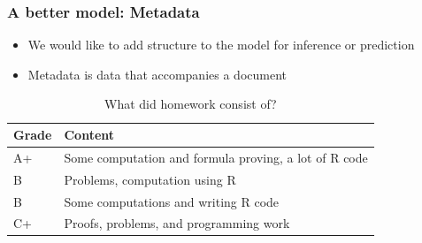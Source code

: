 \documentclass[presentation]{beamer}
\begin{document}
\begin{frame}
\frametitle{A better model: Metadata}
\begin{itemize}
\item We would like to add structure to the model for inference or prediction
\pause
\item Metadata is data that accompanies a document
\pause
\end{itemize}
\begin{table}[!hbpt]
\caption{What did homework consist of?} \label{tab:title}
\pause
\begin{center}
\begin{tabular} {l l}
\textbf{Grade} & \textbf{Content} \\
\hline
A+ & Some computation and formula proving, a lot of R code \\
B & Problems, computation using R \\
B & Some computations and writing R code\\
C+ & Proofs, problems, and programming work \\  %
\end{tabular}
\end{center}
\end{table}
\end{frame}

\end{document}
